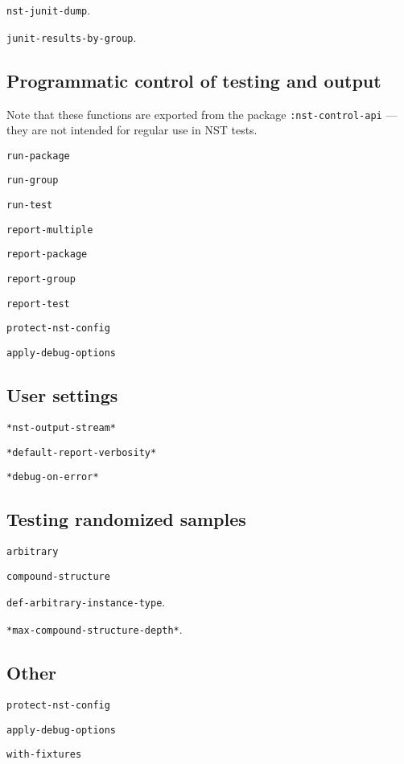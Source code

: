 \texttt{nst-junit-dump}.

\texttt{junit-results-by-group}.

\subsection{Programmatic control of testing and output}
Note that these functions are exported from the package
\texttt{:nst-control-api} --- they are not intended for regular use in
NST tests.

\texttt{run-package}

\texttt{run-group}

\texttt{run-test}
             
\texttt{report-multiple}

\texttt{report-package}

\texttt{report-group}

\texttt{report-test}

\texttt{protect-nst-config}

\texttt{apply-debug-options}

\subsection{User settings}
\texttt{*nst-output-stream*}

\texttt{*default-report-verbosity*}

\texttt{*debug-on-error*}

\subsection{Testing randomized samples}
\texttt{arbitrary}

\texttt{compound-structure}

\texttt{def-arbitrary-instance-type}.

\texttt{*max-compound-structure-depth*}.

\subsection{Other}
\texttt{protect-nst-config}

\texttt{apply-debug-options}

\texttt{with-fixtures}

